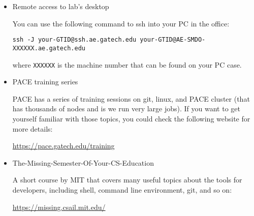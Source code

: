 \documentclass{article}
\begin{document}
\begin{itemize}
    \item Remote access to lab's desktop

    You can use the following command to ssh into your PC in the office:

    \texttt{ssh -J your-GTID@ssh.ae.gatech.edu your-GTID@AE-SMDO-XXXXXX.ae.gatech.edu}

    where \texttt{XXXXXX} is the machine number that can be found on your PC case.

    \item PACE training series

    PACE has a series of training sessions on git, linux, and PACE cluster (that has thousands of nodes
    and is we run very large jobs).
    If you want to get yourself familiar with those topics, you could
    check the following website for more details:

    \href{https://pace.gatech.edu/training}{https://pace.gatech.edu/training}

    \item The-Missing-Semester-Of-Your-CS-Education

    A short course by MIT that covers many useful topics about the tools for developers,
    including shell, command line environment, git, and so on:

    \href{https://missing.csail.mit.edu/}{https://missing.csail.mit.edu/}

\end{itemize}
\end{document}
